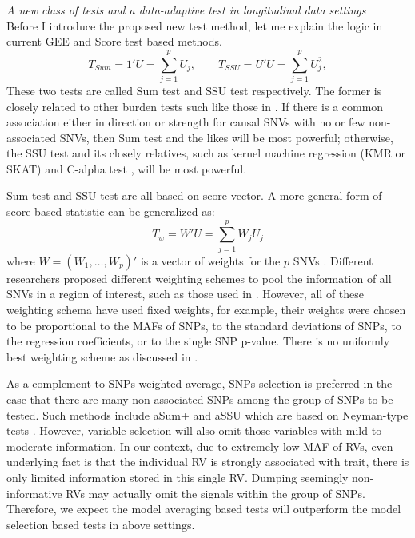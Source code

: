 \documentclass[12pt]{article}
\begin{document}
\textit{A new class of tests and a data-adaptive test in longitudinal data settings}\\
Before I introduce the proposed new test method, let me explain the logic in current GEE and Score test based methods.
$$
T_{Sum} = 1' U = \sum_{j=1}^p U_j, \qquad T_{SSU} = U'U = \sum_{j=1}^p U_j^2,
$$
These two tests are called Sum test and SSU test \cite{Pan2009} respectively. The former is closely related to other burden tests such like those in \cite{Morgenthaler2007,Li2008,Madsen2009}. If there is a common association either in direction or strength for causal SNVs with no or few non-associated SNVs, then Sum test and the likes will be most powerful; otherwise, the SSU test and its closely relatives, such as kernel machine regression (KMR or SKAT) \cite{Lee2012,Ionita-Laza2013,Oualkacha2013,Lee2012a,Wu2011} and C-alpha test \cite{Neale2011}, will be most powerful. 

Sum test and SSU test are all based on score vector. A more general form of score-based statistic can be generalized as:
$$
T_w = W' U = \sum_{j=1}^p W_j U_j
$$
where $W = (W_1, \ldots, W_p)'$ is a vector of weights for the $p$ SNVs \cite{Lin2011}. Different researchers proposed different weighting schemes to pool the information of all SNVs in a region of interest, such as those used in \cite{Madsen2009,Sul2011,Pan2011,Han2010,Li2008,Zhang2011,Lin2011,Basu2011}. However, all of these weighting schema have used fixed weights, for example, their weights were chosen to be proportional to the MAFs of SNPs, to the standard deviations of SNPs, to the regression coefficients, or to the single SNP p-value. There is no uniformly best weighting scheme as discussed in \cite{pan2014powerful,Basu2011,Pan2011}. 

As a complement to SNPs weighted average, SNPs selection is preferred in the case that there are many non-associated SNPs among the group of SNPs to be tested. Such methods include aSum+ and aSSU which are based on Neyman-type tests \cite{Neyman1937}. However, variable selection will also omit those variables with mild to moderate information. In our context, due to extremely low MAF of RVs, even underlying fact is that the individual RV is strongly associated with trait, there is only limited information stored in this single RV. Dumping seemingly non-informative RVs may actually omit the signals within the group of SNPs. Therefore, we expect the model averaging based tests will outperform the model selection based tests in above settings.
\end{document}
